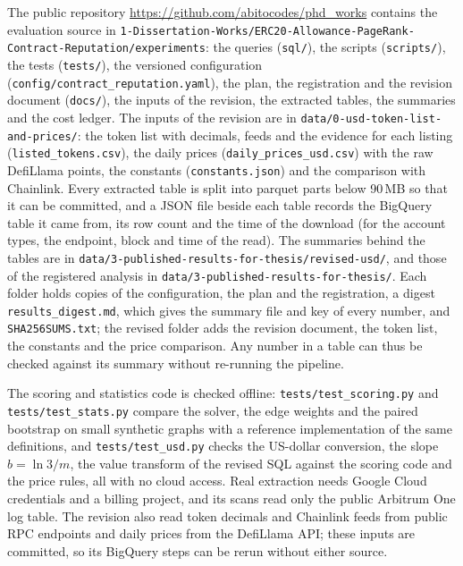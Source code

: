 The public repository \url{https://github.com/abitocodes/phd_works} contains the evaluation source in \texttt{1-Dissertation-Works/ERC20-Allowance-PageRank-Contract-Reputation/experiments}: the queries (\texttt{sql/}), the scripts (\texttt{scripts/}), the tests (\texttt{tests/}), the versioned configuration (\texttt{config/contract\_reputation.yaml}), the plan, the registration and the revision document (\texttt{docs/}), the inputs of the revision, the extracted tables, the summaries and the cost ledger. The inputs of the revision are in \texttt{data/0-usd-token-list-and-prices/}: the token list with decimals, feeds and the evidence for each listing (\texttt{listed\_tokens.csv}), the daily prices (\texttt{daily\_prices\_usd.csv}) with the raw DefiLlama points, the constants (\texttt{constants.json}) and the comparison with Chainlink. Every extracted table is split into parquet parts below 90\,MB so that it can be committed, and a JSON file beside each table records the BigQuery table it came from, its row count and the time of the download (for the account types, the endpoint, block and time of the read). The summaries behind the tables are in \texttt{data/3-published-results-for-thesis/revised-usd/}, and those of the registered analysis in \texttt{data/3-published-results-for-thesis/}. Each folder holds copies of the configuration, the plan and the registration, a digest \texttt{results\_digest.md}, which gives the summary file and key of every number, and \texttt{SHA256SUMS.txt}; the revised folder adds the revision document, the token list, the constants and the price comparison. Any number in a table can thus be checked against its summary without re-running the pipeline.

The scoring and statistics code is checked offline: \texttt{tests/test\_scoring.py} and \texttt{tests/test\_stats.py} compare the solver, the edge weights and the paired bootstrap on small synthetic graphs with a reference implementation of the same definitions, and \texttt{tests/test\_usd.py} checks the US-dollar conversion, the slope $b=\ln 3/m$, the value transform of the revised SQL against the scoring code and the price rules, all with no cloud access. Real extraction needs Google Cloud credentials and a billing project, and its scans read only the public Arbitrum One log table. The revision also read token decimals and Chainlink feeds from public RPC endpoints and daily prices from the DefiLlama API; these inputs are committed, so its BigQuery steps can be rerun without either source.


